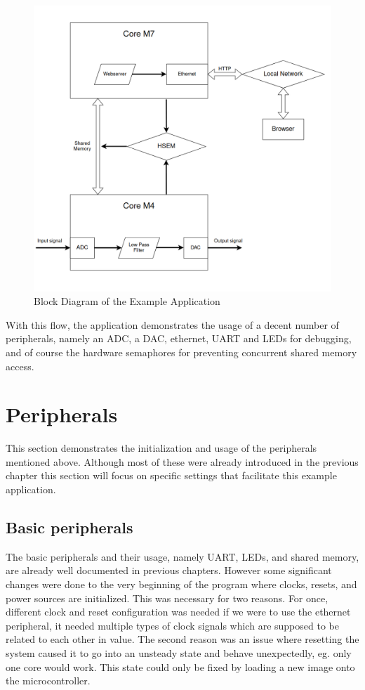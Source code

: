 \begin{figure}[!ht]
    \centering
    \includegraphics[width=150mm, keepaspectratio]{figures/example-app-flowchart.png}
    \caption{Block Diagram of the Example Application}
    \label{fig:hsem-interrupt-sd}
\end{figure}

With this flow, the application demonstrates the usage of  a decent number of peripherals, namely an ADC, a DAC, ethernet, UART and LEDs for debugging, and of course the hardware semaphores for preventing concurrent shared memory access.

\section{Peripherals}

This section demonstrates the initialization and usage of the peripherals mentioned above. Although most of these were already introduced in the previous chapter this section will focus on specific settings that facilitate this example application.

\subsection{Basic peripherals}

The basic peripherals and their usage, namely UART, LEDs, and shared memory, are already well documented in previous chapters. However some significant changes were done to the very beginning of the program where clocks, resets, and power sources are initialized. This was necessary for two reasons. For once, different clock and reset configuration was needed if we were to use the ethernet peripheral, it needed multiple types of clock signals which are supposed to be related to each other in value. The second reason was an issue where resetting the system caused it to go into an unsteady state and behave unexpectedly, eg. only one core would work. This state could only be fixed by loading a new image onto the microcontroller.

